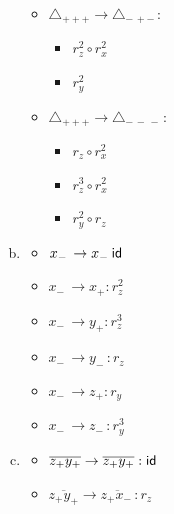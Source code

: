 \begin{enumerate}[(a)]
\begin{multicols}{2}
\begin{itemize}
	\item
	$\triangle_{ +++} \rightarrow \triangle_{-\,+-\,}:$
		\begin{itemize}
		\item
		$r_z^2 \circ r_x^2$
		
		\item
		$r_y^2$
		\end{itemize}
		
	\item
	$\triangle_{ +++} \rightarrow \triangle_{-\,-\,-\,}:$
		\begin{itemize}
		\item
		$r_z \circ r_x^2$
		
		\item
		$r_z^3 \circ r_x^2$
		
		\item
		$r_y^2 \circ r_z$
		\end{itemize}
	\end{itemize}
	\end{multicols}
	
\item
	\begin{multicols}{3}
	\begin{itemize}
	\item
	$x_-\, \rightarrow x_-\: \sf{id}$
	
	\item
	$x_-\, \rightarrow x_+: r_z^2$
	
	\item
	$x_-\, \rightarrow y_+: r_z^3$
	
	\item
	$x_-\, \rightarrow y_-\,: r_z$
	
	\item
	$x_-\, \rightarrow z_+: r_y $
	
	\item
	$x_-\, \rightarrow z_-\,: r_y^3$
	\end{itemize}
	\end{multicols}
	
\item
	\begin{multicols}{2}
	\begin{itemize}
	\item
	$\overline{z_+y_+} \rightarrow \overline{z_+y_+}: \sf{id}$
	
	\item
	$\overline{z_+y_+} \rightarrow \overline{z_+x_-\,}: r_z$
	

\end{itemize}
\end{multicols}
\end{enumerate}
